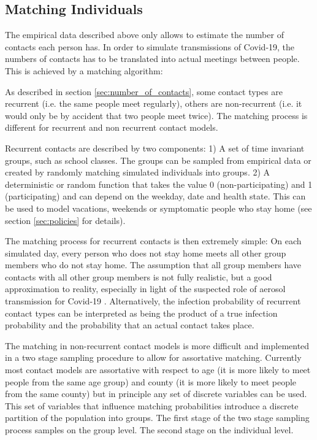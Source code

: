 \subsection{Matching Individuals}
\label{sec:matching}

The empirical data described above only allows to estimate the number of contacts each
person has. In order to simulate transmissions of Covid-19, the numbers of contacts has
to be translated into actual meetings between people. This is achieved by a matching
algorithm:

As described in section \ref{sec:number_of_contacts}, some contact types are recurrent
(i.e. the same people meet regularly), others are non-recurrent (i.e. it would only be
by accident that two people meet twice). The matching process is different for recurrent
and non recurrent contact models.

Recurrent contacts are described by two components: 1) A set of time invariant groups, such as school classes. The groups can be sampled from empirical data or created by
randomly matching simulated individuals into groups. 2) A deterministic or random function that takes the value 0 (non-participating) and 1
(participating) and can depend on the weekday, date and health state. This can be used
to model vacations, weekends or symptomatic people who stay home (see section
\ref{sec:policies} for details).

The matching process for recurrent contacts is then extremely simple: On each simulated
day, every person who does not stay home meets all other group members who do not stay
home. The assumption that all group members have contacts with all other group members
is not fully realistic, but a good approximation to reality, especially in
light of the suspected role of aerosol transmission for Covid-19 \citep{Morawska2020,
Anderson2020}. Alternatively, the infection probability of recurrent contact types can
be interpreted as being the product of a true infection probability and the probability
that an actual contact takes place.

The matching in non-recurrent contact models is more difficult and implemented in a two
stage sampling procedure to allow for assortative matching. Currently most contact
models are assortative with respect to age (it is more likely to meet people from the
same age group) and county (it is more likely to meet people from the same county) but
in principle any set of discrete variables can be used. This set of variables that
influence matching probabilities introduce a discrete partition of the population into
groups. The first stage of the two stage sampling process samples on the group level.
The second stage on the individual level.

